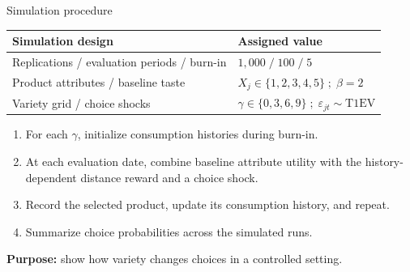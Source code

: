 \documentclass[aspectratio=169,11pt]{beamer}
\begin{document}
\begin{frame}[noframenumbering,label=simulation-procedure]{Simulation procedure}
\small
\begin{tabular}{ll}\toprule
Simulation design & Assigned value\\\midrule
Replications / evaluation periods / burn-in & $1{,}000\;/\;100\;/\;5$\\
Product attributes / baseline taste & $X_j\in\{1,2,3,4,5\}\;;\;\beta=2$\\
Variety grid / choice shocks & $\gamma\in\{0,3,6,9\}\;;\;\varepsilon_{jt}\sim\mathrm{T1EV}$\\\bottomrule
\end{tabular}
\begin{enumerate}
\item For each $\gamma$, initialize consumption histories during burn-in.
\item At each evaluation date, combine baseline attribute utility with the history-dependent distance reward and a choice shock.
\item Record the selected product, update its consumption history, and repeat.
\item Summarize choice probabilities across the simulated runs.
\end{enumerate}
\textbf{Purpose:} show how variety changes choices in a controlled setting.
\par\smallskip
\hyperlink{simulation-results}{}\quad \hyperlink{demand-model}{}
\end{frame}
\end{document}
